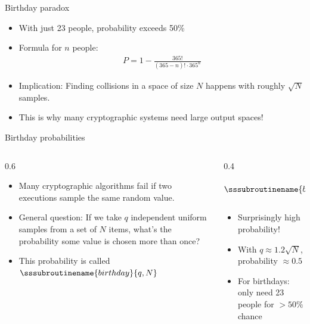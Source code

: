 \documentclass[aspectratio=169, lualatex, handout]{beamer}
\begin{document}
\begin{frame}{Birthday paradox}
	\begin{itemize}[<+->]
		\item With just 23 people, probability exceeds 50\%
		\item Formula for $n$ people:
		      \begin{align*}
			      P = 1 - \frac{365!}{(365-n)! \cdot 365^n}
		      \end{align*}
		\item Implication: Finding collisions in a space of size $N$ happens with roughly $\sqrt{N}$ samples.
		\item This is why many cryptographic systems need large output spaces!
	\end{itemize}
\end{frame}

\begin{frame}{Birthday probabilities}
	\begin{columns}[c]
		\begin{column}{0.6\textwidth}
			\begin{itemize}[<+->]
				\item Many cryptographic algorithms fail if two executions sample the same random value.
				\item General question: If we take $q$ independent uniform samples from a set of $N$ items, what's the probability some value is chosen more than once?
				\item This probability is called $\sssubroutinename{birthday}{q,N}$
			\end{itemize}
		\end{column}
		\begin{column}{0.4\textwidth}
			\begin{align*}
				\sssubroutinename{birthday}{q,N} = 1 - \prod_{i=1}^{q-1} \left(1 - \frac{i}{N}\right)
			\end{align*}
			\begin{itemize}[<+->]
				\item Surprisingly high probability!
				\item With $q \approx 1.2\sqrt{N}$, probability $\approx 0.5$
				\item For birthdays: only need 23 people for $>50\%$ chance
			\end{itemize}
		\end{column}
	\end{columns}
\end{frame}
\end{document}
